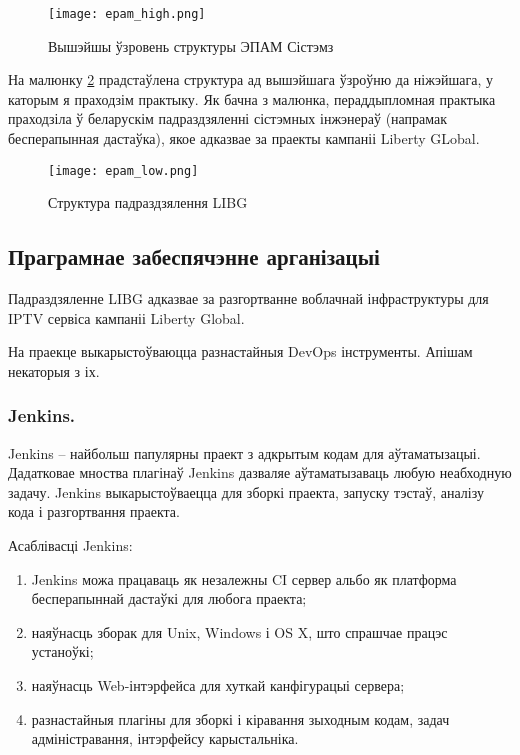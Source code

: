 \clearpage

\begin{figure}[h!]
    \centering
    \texttt{[image: epam\_high.png]}
    \caption{Вышэйшы ўзровень структуры ЭПАМ Сістэмз}
    \label{img: epam high} 
\end{figure}

На малюнку \ref{img: epam low} прадстаўлена структура ад вышэйшага ўзроўню да ніжэйшага, у каторым
я праходзім практыку. Як бачна з малюнка, пераддыпломная практыка праходзіла ў беларускім падраздзяленні сістэмных інжэнераў (напрамак бесперапынная дастаўка), якое 
адказвае за праекты кампаніі Liberty GLobal.

\begin{figure}[h!]
    \centering
    \texttt{[image: epam\_low.png]}
    \caption{Структура падраздзялення LIBG}
    \label{img: epam low} 
\end{figure}

\subsection{Праграмнае забеспячэнне арганізацыі}

Падраздзяленне LIBG адказвае за разгортванне воблачнай інфраструктуры для IPTV сервіса кампаніі
Liberty Global.

На праекце выкарыстоўваюцца разнастайныя DevOps інструменты. Апішам некаторыя з іх.

\subsubsection{Jenkins.}

Jenkins -- найбольш папулярны праект з адкрытым кодам для аўтаматызацыі.
Дадатковае мноства плагінаў Jenkins дазваляе аўтаматызаваць
любую неабходную задачу.
Jenkins выкарыстоўваецца для зборкі праекта, запуску тэстаў,
аналізу кода і разгортвання праекта.

Асаблівасці Jenkins:
\begin{enumerate}
    \item Jenkins можа працаваць як незалежны CI сервер альбо
          як платформа бесперапыннай дастаўкі для любога праекта;
    \item наяўнасць зборак для Unix, Windows і OS X, што
          спрашчае працэс устаноўкі;
    \item наяўнасць Web-інтэрфейса для хуткай канфігурацыі сервера;
    \item разнастайныя плагіны для зборкі і кіравання зыходным кодам,
          задач адміністравання, інтэрфейсу карыстальніка.
\end{enumerate}

